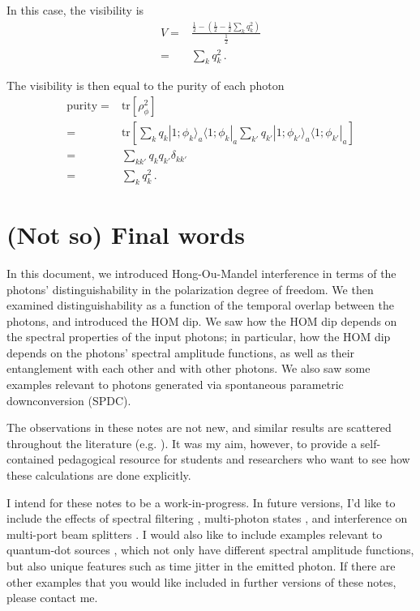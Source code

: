 \documentclass[12pt]{article}
\newcommand{\ket}[2] {| #1 \rangle_{#2}}
\newcommand{\bra}[2] {\langle #1 |_{#2}}
\begin{document}
In this case, the visibility is
\begin{align}
V={}&\frac{\frac{1}{2}-(\frac{1}{2}-\frac{1}{2}\sum_{k}q^2_{k})}{\frac{1}{2}}\\
={}&\sum_{k}q^2_{k}\,.
\end{align}

The visibility is then equal to the purity of each photon
\begin{align}
\mathrm{purity}={}&\mathrm{tr}\left[\rho_{\phi}^2\right]\\
={}&\mathrm{tr}\left[\sum_{k}q_{k}\ket{1;\phi_{k}}{a}\bra{1;\phi_{k}}{a}\sum_{k'}q_{k'}\ket{1;\phi_{k'}}{a}\bra{1;\phi_{k'}}{a}\right]\\
={}&\sum_{kk'}q_{k}q_{k'}\delta_{kk'}\\
={}&\sum_{k}q^2_{k}\,.
\end{align}


\section{(Not so) Final words}

In this document, we introduced Hong-Ou-Mandel interference in terms of the photons' distinguishability in the polarization degree of freedom. We then examined distinguishability as a function of the temporal overlap between the photons, and introduced the HOM dip. We saw how the HOM dip depends on the spectral properties of the input photons; in particular, how the HOM dip depends on the photons' spectral amplitude functions, as well as their entanglement with each other and with other photons. We also saw some examples relevant to photons generated via  spontaneous parametric downconversion (SPDC).

The observations in these notes are not new, and similar results are scattered throughout the literature (e.g. \cite{Fearn1989,Legero2003,Ou2006,Ou2007,Cosme2008}). It was my aim, however, to provide a self-contained pedagogical resource for students and researchers who want to see how these calculations are done explicitly. 

I intend for these notes to be a work-in-progress. In future versions, I'd like to include the effects of spectral filtering \cite{Branczyk2010}, multi-photon states \cite{Ou2006,Cosme2008}, and interference on multi-port beam splitters \cite{Tichy2010,Tan2013}. I would also like to include examples relevant to quantum-dot sources \cite{Dousse2010,Reimer2012,Versteegh2014}, which not only have different spectral amplitude functions, but also unique features such as time jitter in the emitted photon. If there are other examples that you would like included in further versions of these notes, please contact me. 
\end{document}
